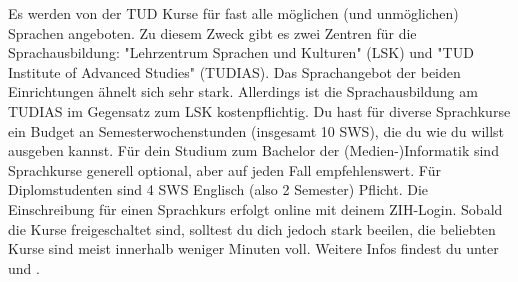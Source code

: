 Es werden von der TUD Kurse für fast alle möglichen (und unmöglichen) Sprachen angeboten.
Zu diesem Zweck gibt es zwei Zentren für die Sprachausbildung: "Lehrzentrum Sprachen und Kulturen" (LSK) und "TUD Institute of Advanced Studies" (TUDIAS).
Das Sprachangebot der beiden Einrichtungen ähnelt sich sehr stark. Allerdings ist die Sprachausbildung am TUDIAS im Gegensatz zum LSK kostenpflichtig.
Du hast für diverse Sprachkurse ein Budget an Semesterwochenstunden (insgesamt 10 SWS), die du wie du willst ausgeben kannst.
Für dein Studium zum Bachelor der (Medien-)Informatik sind Sprachkurse generell optional, aber auf jeden Fall empfehlenswert.
Für Diplomstudenten sind 4 SWS Englisch (also 2 Semester) Pflicht.
Die Einschreibung für einen Sprachkurs erfolgt online  mit deinem ZIH-Login.
Sobald die Kurse freigeschaltet sind, solltest du dich jedoch stark beeilen, die beliebten Kurse sind meist innerhalb weniger Minuten voll.
Weitere Infos findest du unter  und .
